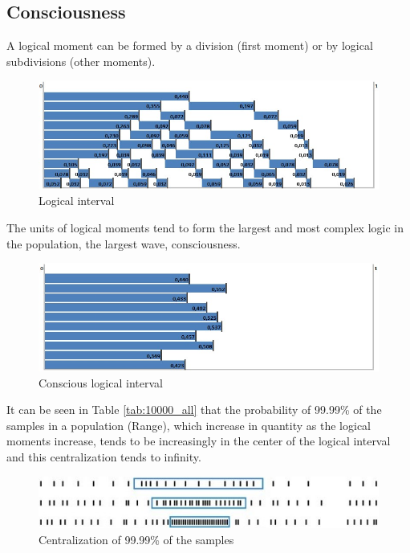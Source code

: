\subsection{Consciousness}
A logical moment can be formed by a division (first moment) or by logical subdivisions (other moments).
	\begin{figure}[H]
	\caption{Logical interval}
	\label{fig:consciousness_logical_moments}
	\centering
	\includegraphics[scale=.7]{sections/images/consciousness_logical_moments.jpg}
	\end{figure}

The units of logical moments tend to form the largest and most complex logic in the population, the largest wave, consciousness.
	\begin{figure}[H]
	\caption{Conscious logical interval}
	\label{fig:consciousness}
	\centering
	\includegraphics[scale=.7]{sections/images/consciousness.jpg}
	\end{figure}

It can be seen in Table \ref{tab:10000_all} that the probability of 99.99\% of the samples in a population (Range), which increase in quantity as the logical moments increase, tends to be increasingly in the center of the logical interval and this centralization tends to infinity.
	\begin{figure}[H]
	\caption{Centralization of 99.99\% of the samples}
	\label{fig:centering_of_99_range}
	\centering
	\includegraphics[scale=1]{sections/images/centering_of_99_range.jpg}
	\end{figure}

